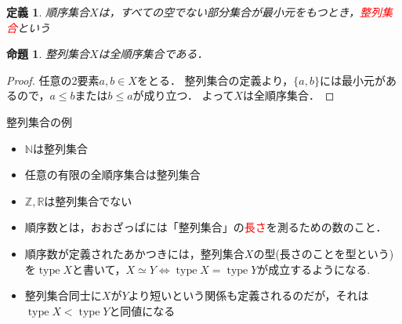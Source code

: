 \documentclass[dvipdfmx,17pt]{beamer}
\theoremstyle{plain}
\newtheorem{defi}[thm]{定義}
\newtheorem{prop}[thm]{命題}
\DeclareMathOperator{\Type}{type}
\begin{document}
\begin{frame}
\begin{defi}
順序集合$X$は，すべての空でない部分集合が最小元をもつとき，\textcolor{red}{整列集合}という
\end{defi}
\end{frame}

\begin{frame}
\begin{prop}
整列集合$X$は全順序集合である．
\end{prop}
\begin{proof}
任意の2要素$a, b \in X$をとる．
整列集合の定義より，$\{a, b\}$には最小元があるので，$a \le b$または$b \le a$が成り立つ．
よって$X$は全順序集合．
\end{proof}
\end{frame}

\begin{frame}{整列集合の例}
\begin{itemize}
\item $\mathbb{N}$は整列集合
\item 任意の有限の全順序集合は整列集合
\item $\mathbb{Z}, \mathbb{R}$は整列集合でない
\end{itemize}
\end{frame}

\begin{frame}
\begin{itemize}
\item 順序数とは，おおざっぱには「整列集合」の\textcolor{red}{長さ}を測るための数のこと．
\end{itemize}
\end{frame}

\begin{frame}
\begin{itemize}
\item 順序数が定義されたあかつきには，整列集合$X$の型(長さのことを型という)を$\Type X$と書いて，$X \simeq Y \iff \Type X = \Type Y$が成立するようになる.
\end{itemize}
\end{frame}

\begin{frame}
\begin{itemize}
\item 整列集合同士に$X$が$Y$より短いという関係も定義されるのだが，それは$\Type X < \Type Y$と同値になる
\end{itemize}
\end{frame}
\end{document}
